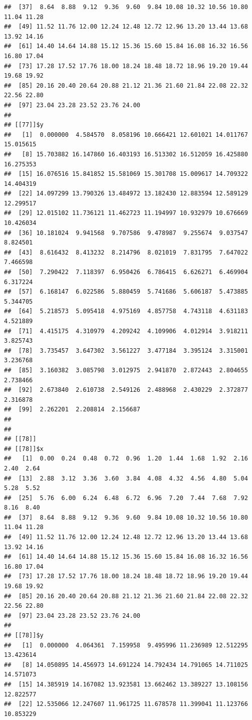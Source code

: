 \documentclass[
  ignorenonframetext,
]{beamer}
\begin{document}
\begin{frame}[fragile]{}
\begin{verbatim}
##  [37]  8.64  8.88  9.12  9.36  9.60  9.84 10.08 10.32 10.56 10.80 11.04 11.28
##  [49] 11.52 11.76 12.00 12.24 12.48 12.72 12.96 13.20 13.44 13.68 13.92 14.16
##  [61] 14.40 14.64 14.88 15.12 15.36 15.60 15.84 16.08 16.32 16.56 16.80 17.04
##  [73] 17.28 17.52 17.76 18.00 18.24 18.48 18.72 18.96 19.20 19.44 19.68 19.92
##  [85] 20.16 20.40 20.64 20.88 21.12 21.36 21.60 21.84 22.08 22.32 22.56 22.80
##  [97] 23.04 23.28 23.52 23.76 24.00
## 
## [[77]]$y
##   [1]  0.000000  4.584570  8.058196 10.666421 12.601021 14.011767 15.015615
##   [8] 15.703882 16.147860 16.403193 16.513302 16.512059 16.425880 16.275353
##  [15] 16.076516 15.841852 15.581069 15.301708 15.009617 14.709322 14.404319
##  [22] 14.097299 13.790326 13.484972 13.182430 12.883594 12.589129 12.299517
##  [29] 12.015102 11.736121 11.462723 11.194997 10.932979 10.676669 10.426034
##  [36] 10.181024  9.941568  9.707586  9.478987  9.255674  9.037547  8.824501
##  [43]  8.616432  8.413232  8.214796  8.021019  7.831795  7.647022  7.466598
##  [50]  7.290422  7.118397  6.950426  6.786415  6.626271  6.469904  6.317224
##  [57]  6.168147  6.022586  5.880459  5.741686  5.606187  5.473885  5.344705
##  [64]  5.218573  5.095418  4.975169  4.857758  4.743118  4.631183  4.521889
##  [71]  4.415175  4.310979  4.209242  4.109906  4.012914  3.918211  3.825743
##  [78]  3.735457  3.647302  3.561227  3.477184  3.395124  3.315001  3.236768
##  [85]  3.160382  3.085798  3.012975  2.941870  2.872443  2.804655  2.738466
##  [92]  2.673840  2.610738  2.549126  2.488968  2.430229  2.372877  2.316878
##  [99]  2.262201  2.208814  2.156687
## 
## 
## [[78]]
## [[78]]$x
##   [1]  0.00  0.24  0.48  0.72  0.96  1.20  1.44  1.68  1.92  2.16  2.40  2.64
##  [13]  2.88  3.12  3.36  3.60  3.84  4.08  4.32  4.56  4.80  5.04  5.28  5.52
##  [25]  5.76  6.00  6.24  6.48  6.72  6.96  7.20  7.44  7.68  7.92  8.16  8.40
##  [37]  8.64  8.88  9.12  9.36  9.60  9.84 10.08 10.32 10.56 10.80 11.04 11.28
##  [49] 11.52 11.76 12.00 12.24 12.48 12.72 12.96 13.20 13.44 13.68 13.92 14.16
##  [61] 14.40 14.64 14.88 15.12 15.36 15.60 15.84 16.08 16.32 16.56 16.80 17.04
##  [73] 17.28 17.52 17.76 18.00 18.24 18.48 18.72 18.96 19.20 19.44 19.68 19.92
##  [85] 20.16 20.40 20.64 20.88 21.12 21.36 21.60 21.84 22.08 22.32 22.56 22.80
##  [97] 23.04 23.28 23.52 23.76 24.00
## 
## [[78]]$y
##   [1]  0.000000  4.064361  7.159958  9.495996 11.236989 12.512295 13.423614
##   [8] 14.050895 14.456973 14.691224 14.792434 14.791065 14.711025 14.571073
##  [15] 14.385919 14.167082 13.923581 13.662462 13.389227 13.108156 12.822577
##  [22] 12.535066 12.247607 11.961725 11.678578 11.399041 11.123766 10.853229

\end{verbatim}
\end{frame}
\end{document}
